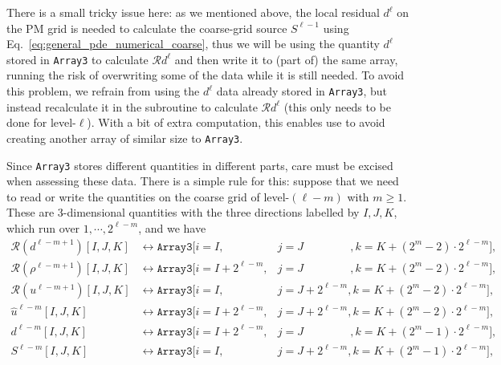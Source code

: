 There is a small tricky issue here: as we mentioned above, the local residual $d^\ell$ on the PM grid is needed to calculate the coarse-grid source $S^{\ell-1}$ using Eq.~\eqref{eq:general_pde_numerical_coarse}, thus we will be using the quantity $d^\ell$ stored in \texttt{Array3} to calculate $\mathcal{R}d^{\ell}$ and then write it to (part of) the same array, running the risk of overwriting some of the data while it is still needed. To avoid this problem, we refrain from using the $d^\ell$ data already stored in \texttt{Array3}, but instead recalculate it in the subroutine to calculate $\mathcal{R}d^\ell$ (this only needs to be done for level-$\ell$). With a bit of extra computation, this enables use to avoid creating another array of similar size to \texttt{Array3}.

Since \texttt{Array3} stores different quantities in different parts, care must be excised when assessing these data. There is a simple rule for this: suppose that we need to read or write the quantities on the coarse grid of level-$(\ell-m)$ with $m\geq1$. These are 3-dimensional quantities with the three directions labelled by $I,J,K$, which run over $1,\cdots,2^{\ell-m}$, and we have
\begin{align}
    \mathcal{R}(d^{\ell-m+1}) \left[I,J,K\right] &\leftrightarrow \texttt{Array3}[i=I,&j=J\phantom{\ +2^{\ell-m}},k=K + \left(2^{m}-2\right)\cdot2^{\ell-m}],\nonumber\\
    \mathcal{R}(\rho^{\ell-m+1})\left[I,J,K\right] &\leftrightarrow \texttt{Array3}[i=I+2^{\ell-m},&j=J\phantom{\ +2^{\ell-m}},k=K + \left(2^{m}-2\right)\cdot2^{\ell-m}],\nonumber\\
    \mathcal{R}(u^{\ell-m+1})\left[I,J,K\right] &\leftrightarrow\texttt{Array3}[i=I,&j=J+2^{\ell-m},k=K + \left(2^{m}-2\right)\cdot2^{\ell-m}],\nonumber\\
    \hat{u}^{\ell-m}\left[I,J,K\right] &\leftrightarrow \texttt{Array3}[i=I+2^{\ell-m},&j=J+2^{\ell-m},k=K + \left(2^{m}-2\right)\cdot2^{\ell-m}],\nonumber\\
    d^{\ell-m}\left[I,J,K\right] &\leftrightarrow \texttt{Array3}[i=I+2^{\ell-m},&j=J\phantom{\ +2^{\ell-m}},k=K + \left(2^{m}-1\right)\cdot2^{\ell-m}],\nonumber\\
    S^{\ell-m}[I,J,K] &\leftrightarrow \texttt{Array3}[i=I,&j=J+2^{\ell-m},k=K + \left(2^{m}-1\right)\cdot2^{\ell-m}],
\end{align}
